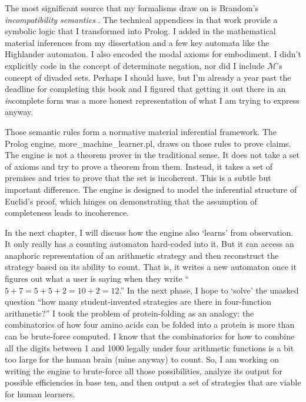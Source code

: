 \documentclass[12pt]{book}
\begin{document}
The most significant source that my formalisms draw on is Brandom's \textit{incompatibility semantics} \parencite{Brandom2008}. The technical appendices in that work provide a symbolic logic that I transformed into Prolog. I added in the mathematical material inferences from my dissertation and a few key automata like the Highlander automaton. I also encoded the modal axioms for embodiment. I didn't explicitly code in the concept of determinate negation, nor did I include $\mathcal{M}$'s concept of divaded sets. Perhaps I should have, but I'm already a year past the deadline for completing this book and I figured that getting it out there in an \textit{in}complete form was a more honest representation of what I am trying to express anyway. 

Those semantic rules form a normative material inferential framework. The Prolog engine, more\_machine\_learner.pl, draws on those rules to prove claims. The engine is not a theorem prover in the traditional sense. It does not take a set of axioms and try to prove a theorem from them. Instead, it takes a set of premises and tries to prove that the set is incoherent. This is a subtle but important difference. The engine is designed to model the inferential structure of Euclid's proof, which hinges on demonstrating that the assumption of completeness leads to incoherence.

In the next chapter, I will discuss how the engine also `learns' from observation. It only really has a counting automaton hard-coded into it. But it can access an anaphoric representation of an arithmetic strategy and then reconstruct the strategy based on its ability to count. That is, it writes a new automaton once it figures out what a user is saying when they write ``$5+7 = 5+5+2 = 10 + 2 = 12$.'' In the next phase, I hope to `solve' the unasked question ``how many student-invented strategies are there in four-function arithmetic?'' I took the problem of protein-folding as an analogy: the combinatorics of how four amino acids can be folded into a protein is more than can be brute-force computed. I know that the combinatorics for how to combine all the digits between 1 and 1000 legally under four arithmetic functions is a bit too large for the human brain (mine anyway) to count. So, I am working on writing the engine to brute-force all those possibilities, analyze its output for possible efficiencies in base ten, and then output a set of strategies that are viable for human learners. 
\end{document}
